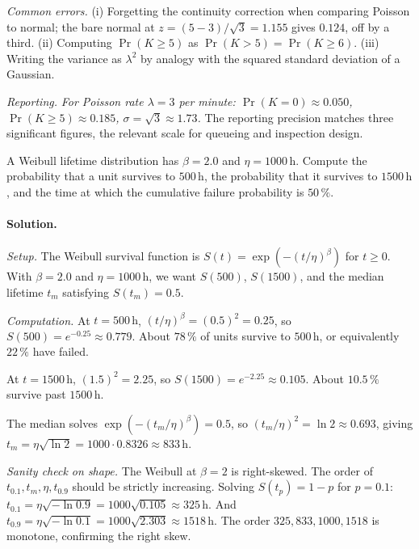 \textit{Common errors.} (i) Forgetting the continuity correction
when comparing Poisson to normal; the bare normal at $z = (5 - 3)
/\sqrt{3} = 1.155$ gives $0.124$, off by a third. (ii) Computing
$\Pr(K \geq 5)$ as $\Pr(K > 5) = \Pr(K \geq 6)$. (iii) Writing the
variance as $\lambda^{2}$ by analogy with the squared standard
deviation of a Gaussian.

\textit{Reporting.} \emph{For Poisson rate $\lambda = 3$ per
minute: $\Pr(K = 0) \approx 0.050$, $\Pr(K \geq 5) \approx 0.185$,
$\sigma = \sqrt{3} \approx 1.73$.} The reporting precision matches
three significant figures, the relevant scale for queueing and
inspection design.

\begin{exercise}
A Weibull lifetime distribution has $\beta = 2.0$ and $\eta = 1000
\,\si{\hour}$. Compute the probability that a unit survives to
$500 \,\si{\hour}$, the probability that it survives to $1500 \,
\si{\hour}$, and the time at which the cumulative failure
probability is $50 \,\%$.
\end{exercise}

\paragraph{Solution.}
\textit{Setup.} The Weibull survival function is
$S(t) = \exp(-(t/\eta)^{\beta})$ for $t \geq 0$. With $\beta = 2.0$
and $\eta = 1000 \,\text{h}$, we want $S(500)$, $S(1500)$, and the
median lifetime $t_{m}$ satisfying $S(t_{m}) = 0.5$.

\textit{Computation.} At $t = 500 \,\text{h}$,
$(t/\eta)^{\beta} = (0.5)^{2} = 0.25$, so $S(500) = e^{-0.25}
\approx 0.779$. About $78 \,\%$ of units survive to $500 \,\text{h}$,
or equivalently $22 \,\%$ have failed.

At $t = 1500 \,\text{h}$, $(1.5)^{2} = 2.25$, so $S(1500) = e^{-2.25}
\approx 0.105$. About $10.5 \,\%$ survive past $1500 \,\text{h}$.

The median solves $\exp(-(t_{m}/\eta)^{\beta}) = 0.5$, so
$(t_{m}/\eta)^{2} = \ln 2 \approx 0.693$, giving
$t_{m} = \eta \sqrt{\ln 2} = 1000 \cdot 0.8326 \approx 833 \,\text{h}$.

\textit{Sanity check on shape.} The Weibull at $\beta = 2$ is
right-skewed. The order of $t_{0.1}, t_{m}, \eta, t_{0.9}$ should be
strictly increasing. Solving $S(t_{p}) = 1 - p$ for $p = 0.1$:
$t_{0.1} = \eta\sqrt{-\ln 0.9} = 1000\sqrt{0.105}
\approx 325 \,\text{h}$. And $t_{0.9} = \eta\sqrt{-\ln 0.1}
= 1000\sqrt{2.303} \approx 1518 \,\text{h}$. The order $325, 833,
1000, 1518$ is monotone, confirming the right skew.

